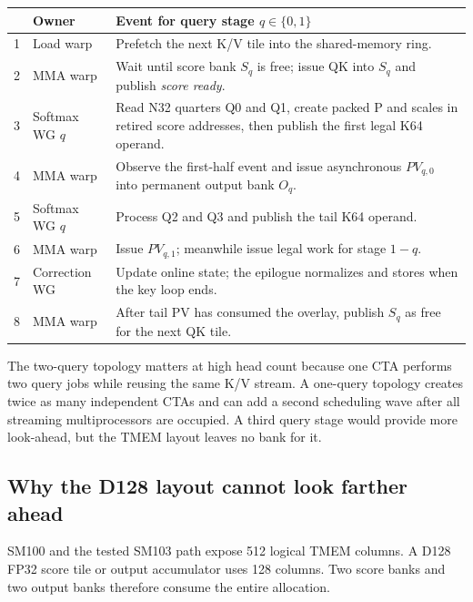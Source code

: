 \begin{algorithm}[htbp]
\caption{Two-query score-to-PV ownership protocol inherited from HAO}
\label{alg:hao-pipeline}
\small
\begin{tabularx}{\textwidth}{@{}r p{} X@{}}
\toprule
& Owner & Event for query stage $q\in\{0,1\}$ \\
\midrule
1 & Load warp & Prefetch the next K/V tile into the shared-memory ring. \\
2 & MMA warp & Wait until score bank $S_q$ is free; issue QK into $S_q$ and publish \emph{score ready}. \\
3 & Softmax WG $q$ & Read N32 quarters Q0 and Q1, create packed P and scales in retired score addresses, then publish the first legal K64 operand. \\
4 & MMA warp & Observe the first-half event and issue asynchronous $PV_{q,0}$ into permanent output bank $O_q$. \\
5 & Softmax WG $q$ & Process Q2 and Q3 and publish the tail K64 operand. \\
6 & MMA warp & Issue $PV_{q,1}$; meanwhile issue legal work for stage $1-q$. \\
7 & Correction WG & Update online state; the epilogue normalizes and stores when the key loop ends. \\
8 & MMA warp & After tail PV has consumed the overlay, publish $S_q$ as free for the next QK tile. \\
\bottomrule
\end{tabularx}
\end{algorithm}

The two-query topology matters at high head count because one CTA performs two
query jobs while reusing the same K/V stream.  A one-query topology creates
twice as many independent CTAs and can add a second scheduling wave after all
streaming multiprocessors are occupied.  A third query stage would provide
more look-ahead, but the TMEM layout leaves no bank for it.

\subsection{Why the D128 layout cannot look farther ahead}

SM100 and the tested SM103 path expose 512 logical TMEM columns. A D128 FP32
score tile or output accumulator uses 128 columns. Two score banks and two
output banks therefore consume the entire allocation.

